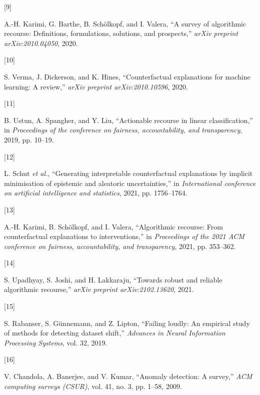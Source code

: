 \documentclass[
  conference]{IEEEtran}
\newlength{\cslhangindent}
\newlength{\csllabelwidth}
\newlength{\cslentryspacingunit} %
\newenvironment{CSLReferences}[2] %
 {%
  \setlength{\parindent}{0pt}
  \ifodd #1
  \let\oldpar\par
  \def\par{\hangindent=\cslhangindent\oldpar}
  \fi
  \setlength{\parskip}{#2\cslentryspacingunit}
 }%
 {}
\newcommand{\CSLLeftMargin}[1]{\parbox[t]{\csllabelwidth}{#1}}
\newcommand{\CSLRightInline}[1]{\parbox[t]{\linewidth - \csllabelwidth}{#1}\break}
\begin{document}
\begin{CSLReferences}{0}{0}
\leavevmode{}%
\CSLLeftMargin{{[}9{]} }%
\CSLRightInline{A.-H. Karimi, G. Barthe, B. Schölkopf, and I. Valera,
{``A survey of algorithmic recourse: Definitions, formulations,
solutions, and prospects,''} \emph{arXiv preprint arXiv:2010.04050},
2020.}

\leavevmode{}%
\CSLLeftMargin{{[}10{]} }%
\CSLRightInline{S. Verma, J. Dickerson, and K. Hines, {``Counterfactual
explanations for machine learning: A review,''} \emph{arXiv preprint
arXiv:2010.10596}, 2020.}

\leavevmode{}%
\CSLLeftMargin{{[}11{]} }%
\CSLRightInline{B. Ustun, A. Spangher, and Y. Liu, {``Actionable
recourse in linear classification,''} in \emph{Proceedings of the
conference on fairness, accountability, and transparency}, 2019, pp.
10--19.}

\leavevmode{}%
\CSLLeftMargin{{[}12{]} }%
\CSLRightInline{L. Schut \emph{et al.}, {``Generating interpretable
counterfactual explanations by implicit minimisation of epistemic and
aleatoric uncertainties,''} in \emph{International conference on
artificial intelligence and statistics}, 2021, pp. 1756--1764.}

\leavevmode{}%
\CSLLeftMargin{{[}13{]} }%
\CSLRightInline{A.-H. Karimi, B. Schölkopf, and I. Valera,
{``Algorithmic recourse: From counterfactual explanations to
interventions,''} in \emph{Proceedings of the 2021 ACM conference on
fairness, accountability, and transparency}, 2021, pp. 353--362.}

\leavevmode{}%
\CSLLeftMargin{{[}14{]} }%
\CSLRightInline{S. Upadhyay, S. Joshi, and H. Lakkaraju, {``Towards
robust and reliable algorithmic recourse,''} \emph{arXiv preprint
arXiv:2102.13620}, 2021.}

\leavevmode{}%
\CSLLeftMargin{{[}15{]} }%
\CSLRightInline{S. Rabanser, S. Günnemann, and Z. Lipton, {``Failing
loudly: An empirical study of methods for detecting dataset shift,''}
\emph{Advances in Neural Information Processing Systems}, vol. 32,
2019.}

\leavevmode{}%
\CSLLeftMargin{{[}16{]} }%
\CSLRightInline{V. Chandola, A. Banerjee, and V. Kumar, {``Anomaly
detection: A survey,''} \emph{ACM computing surveys (CSUR)}, vol. 41,
no. 3, pp. 1--58, 2009.}


\end{CSLReferences}
\end{document}

